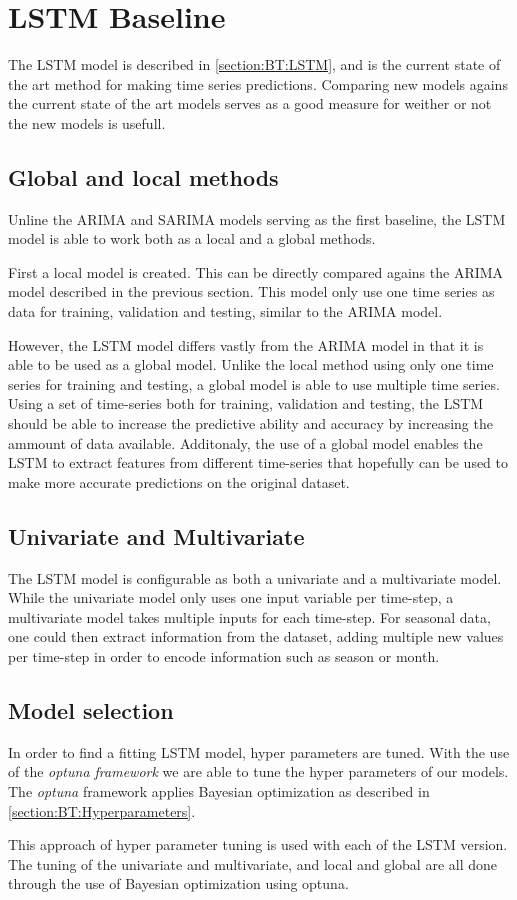 \section{LSTM Baseline}
\label{section:Architecture:Baselines:LSTM}

The LSTM model is described in \cref{section:BT:LSTM}, and is the current state of the art method for making time series predictions.
Comparing new models agains the current state of the art models serves as a good measure for weither or not the new models is usefull.

\subsection{Global and local methods}
Unline the ARIMA and SARIMA models serving as the first baseline,
the LSTM model is able to work both as a local and a global methods.

First a local model is created. This can be directly compared agains the ARIMA model described in the previous section.
This model only use one time series as data for training, validation and testing, similar to the ARIMA model.

However, the LSTM model differs vastly from the ARIMA model in that it is able to be used as a global model.
Unlike the local method using only one time series for training and testing,
a global model is able to use multiple time series.
Using a set of time-series both for training, validation and testing,
the LSTM should be able to increase the predictive ability and accuracy by increasing the ammount of data available.
Additonaly, the use of a global model enables the LSTM to extract features from different time-series that hopefully can be used to make more accurate predictions on the original dataset.

\subsection{Univariate and Multivariate}
The LSTM model is configurable as both a univariate and a multivariate model.
While the univariate model only uses one input variable per time-step, a multivariate model takes multiple inputs for each time-step.
For seasonal data, one could then extract information from the dataset, adding multiple new values per time-step in order to encode information such as season or month.

\subsection{Model selection}
In order to find a fitting LSTM model, hyper parameters are tuned.
With the use of the \textit{optuna framework} %
we are able to tune the hyper parameters of our models.
The \textit{optuna} framework applies Bayesian optimization as described in \cref{section:BT:Hyperparameters}.

This approach of hyper parameter tuning is used with each of the LSTM version.
The tuning of the univariate and multivariate, and local and global are all done through the use of Bayesian optimization using optuna.



